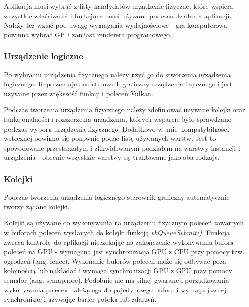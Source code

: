Aplikacja musi wybrać z listy kandydatów urządzenie fizyczne, które wspiera wszystkie właściwości i funkcjonalności używane podczas działania aplikacji. Należy też wziąć pod uwagę wymagania wydajnościowe - gra komputerowa powinna wybrać GPU zamiast renderera programowego.


\subsubsection{Urządzenie logiczne}

Po wybraniu urządzenia fizycznego należy użyć go do stworzenia urządzenia logicznego. Reprezentuje ono
sterownik graficzny urządzenia fizycznego i jest używane przez większość funkcji i poleceń Vulkan.

Podczas tworzenia urządzenia fizycznego należy zdefiniować używane kolejki oraz funkcjonalności i rozszerzenia urządzenia, których wsparcie było sprawdzane podczas wyboru urządzenia fizycznego.
Dodatkowo w imię kompatybilności wstecznej powinno się ponownie podać listę używanych warstw. Jest to spowodowane przestarzałym i zlikwidowanym podziałem na warstwy instancji i urządzenia - obecnie wszystkie warstwy są traktowane jako oba rodzaje.


\subsubsection{Kolejki}

Podczas tworzenia urządzenia logicznego sterownik graficzny automatycznie tworzy żądane kolejki.

Kolejki są używane do wykonywania na urządzeniu fizycznym poleceń zawartych w buforach poleceń wysłanych do kolejki funkcją \textit{vkQueueSubmit()}. Funkcja zwraca kontrolę do aplikacji nieczekając na zakończenie wykonywania bufora poleceń na GPU - wymagana jest synchronizacja GPU z CPU przy pomocy tzw. ogrodzeń (ang. fence).
Wykonanie buforów poleceń może się odbywać poza kolejnością lub nakładać i wymaga synchronizacji GPU z GPU przy pomocy semafor (ang. semaphore).
Podobnie nie ma silnej gwarancji porządkowania wykonywania poleceń należącego do pojedynczego bufora i wymaga jawnej synchronizacji używając barier potoku lub zdarzeń.

